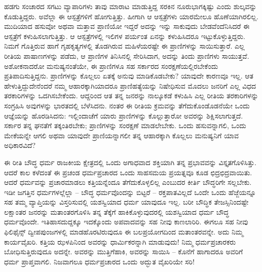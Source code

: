 ಹಡಗು ಸಂಚಾರದ ಸಗಟು ವ್ಯಾಪಾರಿಗಳು ತಾವು ಮಾರಾಟ ಮಾಡುತ್ತಿದ್ದ ಸರಕಿನ ನೂರುಭಾಗಕ್ಕಿಷ್ಟು ಎಂದು ಶುಲ್ಕವನ್ನು ಕೊಡುತ್ತಿದ್ದರು. ಅವೆಲ್ಲಾ ಈ ಆಸ್ಪತ್ರೆಗಳಿಗೆ ಹೋಗುತ್ತಿತ್ತು. ಹೀಗಾಗಿ ಆ ಆಸ್ಪತ್ರೆಗಳು ಯಾರಮೇಲೂ ಹೊಣೆಯಾಗಿರಲಿಲ್ಲ. ಮುದಿಯಾದ ಹಸುವೋ ಅಥವಾ ಮತ್ತಾವ ಪ್ರಾಣಿಯೋ ಇದ್ದರೆ ಅದನ್ನು ಇನ್ನು ಸಾಕುವುದು ಬೇಡವೆಂದೆನಿಸಿದರೆ ಈ ಆಸ್ಪತ್ರೆಗೆ ಕಳುಹಿಸಲಾಗುತ್ತಿತ್ತು. ಆ ಆಸ್ಪತ್ರೆಗಳಲ್ಲಿ ಇಲಿಗಳ ಪರ್ಯಂತ ಏನನ್ನು ಕಳುಹಿಸಿದರೂ ಇಟ್ಟುಕೊಳ್ಳುತ್ತಿದ್ದರು. ನಿಮಗೆ ಗೊತ್ತಿರುವ ಹಾಗೆ ಗೃಹಕೃತ್ಯಗಳಲ್ಲಿ ತೊಡಗಿರುವ ಮಹಿಳೆಯರಷ್ಟೇ ಈ ಪ್ರಾಣಿಗಳನ್ನು ಸಾಯಿಸುತ್ತಾರೆ. ಎಲ್ಲ ರೀತಿಯ ಪಾಷಾಣಗಳನ್ನು ಪಡೆದು, ಆ ಪ್ರಾಣಿಗಳ ತಿನಿಸಿನಲ್ಲಿ ಸೇರಿಸಿದಾಗ, ಅದನ್ನು ತಿಂದು ಪ್ರಾಣಿಗಳು ಸಾಯುತ್ತವೆ. ಅಶೋಕನಾದರೋ ಮನುಷ್ಯನಂತೆಯೇ, ಈ ಪ್ರಾಣಿಗಳೂ ಸಹ ಸರ್ಕಾರದ ಸಂರಕ್ಷಣೆಯಲ್ಲಿರಬೇಕೆಂದು ಪ್ರತಿಪಾದಿಸುತ್ತಿದ್ದನು. ಪ್ರಾಣಿಗಳನ್ನು ಕೊಲ್ಲಲು ಏತಕ್ಕೆ ಅನುವು ಮಾಡಿಕೊಡಬೇಕು? ಯಾವುದೇ ಕಾರಣವೂ ಇಲ್ಲ. ಆತ ಹೇಳುತ್ತಿದ್ದುದೇನೆಂದರೆ ನಮ್ಮ ಆಹಾರಕ್ಕಾಗಿಯಾದರೂ ಪ್ರಾಣಿಹತ್ಯೆಯನ್ನು ನಿಷೇಧಿಸುವ ಮೊದಲು ಜನರಿಗೆ ಎಲ್ಲ ವಿಧದ ತರಕಾರಿಗಳನ್ನು ಒದಗಿಸಬೇಕೆಂದು. ಆದ್ದರಿಂದ ಆತ ತನ್ನ ಜನರನ್ನು ನಾಲ್ಕೂಕಡೆ ಕಳುಹಿಸಿ ಎಲ್ಲ ರೀತಿಯ ತರಕಾರಿಗಳನ್ನು ಸಂಗ್ರಹಿಸಿ ಅವುಗಳನ್ನು ಭಾರತದಲ್ಲಿ ಬೆಳೆಸಿದನು. ನಂತರ ಈ ರೀತಿಯ ಕ್ರಮವನ್ನು ತೆಗೆದುಕೊಂಡೊಡನೆಯೇ ಒಂದು ಆಜ್ಞೆಯನ್ನು ಹೊರಡಿಸಿದನು: ಇಲ್ಲಿಂದಾಚೆಗೆ ಯಾರು ಪ್ರಾಣಿಗಳನ್ನು ಕೊಲ್ಲುತ್ತಾರೋ ಅವರನ್ನು ಶಿಕ್ಷಿಸಲಾಗುತ್ತದೆ. ಸರ್ಕಾರ ತನ್ನ ಘನತೆಗೆ ತಕ್ಕಂತಿರಬೇಕು; ಪ್ರಾಣಿಗಳನ್ನು ಸಂರಕ್ಷಣೆ ಮಾಡಲೇಬೇಕು. ಒಂದು ಹಸುವನ್ನಾಗಲಿ, ಒಂದು ಮೇಕೆಯನ್ನೇ ಆಗಲಿ ಅಥವಾ ಯಾವುದೇ ಪ್ರಾಣಿಯನ್ನಾಗಲೀ ತನ್ನ ಆಹಾರಕ್ಕಾಗಿ ಕೊಲ್ಲಲು ಮನುಷ್ಯನಿಗೆ ಯಾವ ಅಧಿಕಾರವಿದೆ?

ಈ ರೀತಿ ಬೌದ್ಧ ಧರ್ಮ ರಾಜಕೀಯ ಕ್ಷೇತ್ರದಲ್ಲಿ ಒಂದು ಅಗಾಧವಾದ ಶಕ್ತಿಯಾಗಿ ತನ್ನ ಪ್ರಭಾವವನ್ನು ವಿಸ್ತೃತಗೊಳಿಸಿತ್ತು. ಆದರೆ ಕಾಲ ಕಳೆದಂತೆ ಈ ಪ್ರಚಂಡ ಧರ್ಮಪ್ರಚಾರದ ಒಂದು ಸಾಹಸಮಯ ಪ್ರಯತ್ನವೂ ಕೂಡ ಛಿದ್ರಛಿದ್ರವಾಯಿತು. ಆದರೆ ಧರ್ಮವನ್ನು ಪ್ರಚಾರಮಾಡಲು ಕತ್ತಿಯನ್ನೆಂದೂ ತೆಗೆದುಕೊಳ್ಳಲಿಲ್ಲ ಎಂಬುದರ ಕೀರ್ತಿ ಬೌದ್ಧರಿಗೇ ಸಲ್ಲಬೇಕು. ಇಡೀ ಜಗತ್ತಿನ ಧರ್ಮಗಳಲ್ಲೆಲ್ಲಾ – ಬೌದ್ಧ ಧರ್ಮವೊಂದನ್ನು ಬಿಟ್ಟರೆ – ರಕ್ತಪಾತವಿಲ್ಲದೆ ಒಂದೇ ಒಂದು ಹೆಜ್ಜೆಯನ್ನೂ ಸಹ ತಮ್ಮ ವ್ಯಾಪ್ತಿಯನ್ನು ವಿಸ್ತರಿಸುವಲ್ಲಿ ಯಶಸ್ವಿಯಾದ ಧರ್ಮ ಯಾವುದೂ ಇಲ್ಲ. ಬರೀ ಬೌದ್ಧಿಕ ತೇಜಸ್ಸಿನಿಂದಷ್ಟೇ ಲಕ್ಷಾಂತರ ಜನರನ್ನು ಮತಾಂತರಗೊಳಿಸಿ ತನ್ನ ತೆಕ್ಕೆಗೆ ಹಾಕಿಕೊಳ್ಳುವುದರಲ್ಲಿ ಯಶಸ್ವಿಯಾದ ಧರ್ಮ ಬೌದ್ಧ ಧರ್ಮವೊಂದೇ. ಇತಿಹಾಸದುದ್ದಕ್ಕೂ ಇದಕ್ಕೊಂದು ಅಪವಾದವನ್ನು ಸಹ ನೀವು ಕಾಣಲಾರಿರಿ. ಈಗಲೂ ಸಹ ನೀವು ಫಿಲಿಫೈನ್ಸ್ ದ್ವೀಪಪುಂಜಗಳಲ್ಲಿ ಮಾಡಹೊರಟಿರುವುದೂ ಈ ಬಲಪ್ರಯೋಗದಿಂದ ಮತಾಂತರವನ್ನೇ. ಅದು ನಿಮ್ಮ ಕಾರ್ಯವೈಖರಿ. ಕತ್ತಿಯ ಝಳಪಿನಿಂದ ಅವರನ್ನು ಧಾರ್ಮಿಕರನ್ನಾಗಿ ಮಾಡುವುದು! ನಿಮ್ಮ ಧರ್ಮಪ್ರಚಾರಕರು ಬೋಧಿಸುತ್ತಿರುವುದೂ ಅದನ್ನೇ. ಅವರನ್ನು ಮುತ್ತಿಗೆಹಾಕಿ, ಅವರನ್ನು ಸಾಯಿಸಿ – ಕೊನೆಗೆ ಹಾಗಾದರೂ ಅವರಿಗೆ ಧರ್ಮ ಪ್ರಾಪ್ತವಾಗಲಿ. ನಿಜವಾಗಲೂ ಧರ್ಮಪ್ರಚಾರದ ಒಂದು ಅದ್ಭುತ ವೈಖರಿಯೇ ಸರಿ!

